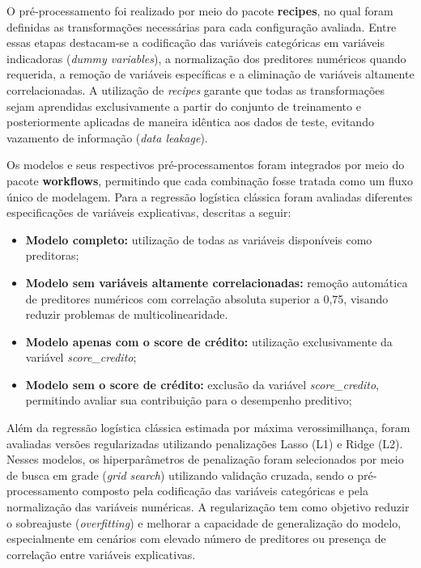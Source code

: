 \documentclass[
  brazilian,
  12pt,
  letterpaper,
  DIV=11,
  numbers=noendperiod]{scrartcl}
\providecommand{\tightlist}{%
  \setlength{\itemsep}{0pt}\setlength{\parskip}{0pt}}
\begin{document}
O pré-processamento foi realizado por meio do pacote \textbf{recipes},
no qual foram definidas as transformações necessárias para cada
configuração avaliada. Entre essas etapas destacam-se a codificação das
variáveis categóricas em variáveis indicadoras (\emph{dummy variables}),
a normalização dos preditores numéricos quando requerida, a remoção de
variáveis específicas e a eliminação de variáveis altamente
correlacionadas. A utilização de \emph{recipes} garante que todas as
transformações sejam aprendidas exclusivamente a partir do conjunto de
treinamento e posteriormente aplicadas de maneira idêntica aos dados de
teste, evitando vazamento de informação (\emph{data leakage}).

Os modelos e seus respectivos pré-processamentos foram integrados por
meio do pacote \textbf{workflows}, permitindo que cada combinação fosse
tratada como um fluxo único de modelagem. Para a regressão logística
clássica foram avaliadas diferentes especificações de variáveis
explicativas, descritas a seguir:

\begin{itemize}
\tightlist
\item
  \textbf{Modelo completo:} utilização de todas as variáveis disponíveis
  como preditoras;
\item
  \textbf{Modelo sem variáveis altamente correlacionadas:} remoção
  automática de preditores numéricos com correlação absoluta superior a
  0,75, visando reduzir problemas de multicolinearidade.
\item
  \textbf{Modelo apenas com o score de crédito:} utilização
  exclusivamente da variável \emph{score\_credito};
\item
  \textbf{Modelo sem o score de crédito:} exclusão da variável
  \emph{score\_credito}, permitindo avaliar sua contribuição para o
  desempenho preditivo;
\end{itemize}

Além da regressão logística clássica estimada por máxima
verossimilhança, foram avaliadas versões regularizadas utilizando
penalizações Lasso (L1) e Ridge (L2). Nesses modelos, os hiperparâmetros
de penalização foram selecionados por meio de busca em grade (\emph{grid
search}) utilizando validação cruzada, sendo o pré-processamento
composto pela codificação das variáveis categóricas e pela normalização
das variáveis numéricas. A regularização tem como objetivo reduzir o
sobreajuste (\emph{overfitting}) e melhorar a capacidade de
generalização do modelo, especialmente em cenários com elevado número de
preditores ou presença de correlação entre variáveis explicativas.
\end{document}
